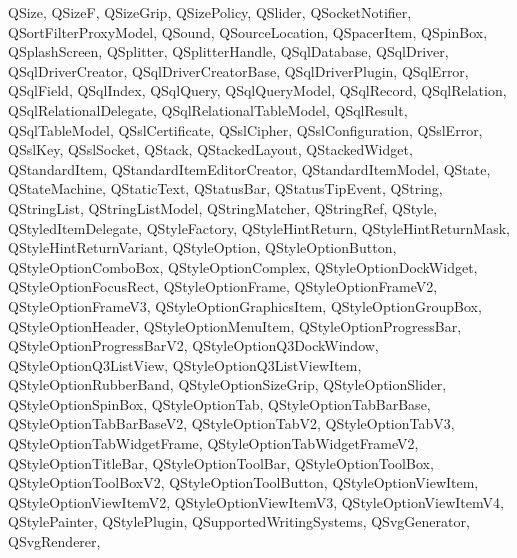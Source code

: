 {{        QSize,
        QSizeF,
        QSizeGrip,
        QSizePolicy,
        QSlider,
        QSocketNotifier,
        QSortFilterProxyModel,
        QSound,
        QSourceLocation,
        QSpacerItem,
        QSpinBox,
        QSplashScreen,
        QSplitter,
        QSplitterHandle,
        QSqlDatabase,
        QSqlDriver,
        QSqlDriverCreator,
        QSqlDriverCreatorBase,
        QSqlDriverPlugin,
        QSqlError,
        QSqlField,
        QSqlIndex,
        QSqlQuery,
        QSqlQueryModel,
        QSqlRecord,
        QSqlRelation,
        QSqlRelationalDelegate,
        QSqlRelationalTableModel,
        QSqlResult,
        QSqlTableModel,
        QSslCertificate,
        QSslCipher,
        QSslConfiguration,
        QSslError,
        QSslKey,
        QSslSocket,
        QStack,
        QStackedLayout,
        QStackedWidget,
        QStandardItem,
        QStandardItemEditorCreator,
        QStandardItemModel,
        QState,
        QStateMachine,
        QStaticText,
        QStatusBar,
        QStatusTipEvent,
        QString,
        QStringList,
        QStringListModel,
        QStringMatcher,
        QStringRef,
        QStyle,
        QStyledItemDelegate,
        QStyleFactory,
        QStyleHintReturn,
        QStyleHintReturnMask,
        QStyleHintReturnVariant,
        QStyleOption,
        QStyleOptionButton,
        QStyleOptionComboBox,
        QStyleOptionComplex,
        QStyleOptionDockWidget,
        QStyleOptionFocusRect,
        QStyleOptionFrame,
        QStyleOptionFrameV2,
        QStyleOptionFrameV3,
        QStyleOptionGraphicsItem,
        QStyleOptionGroupBox,
        QStyleOptionHeader,
        QStyleOptionMenuItem,
        QStyleOptionProgressBar,
        QStyleOptionProgressBarV2,
        QStyleOptionQ3DockWindow,
        QStyleOptionQ3ListView,
        QStyleOptionQ3ListViewItem,
        QStyleOptionRubberBand,
        QStyleOptionSizeGrip,
        QStyleOptionSlider,
        QStyleOptionSpinBox,
        QStyleOptionTab,
        QStyleOptionTabBarBase,
        QStyleOptionTabBarBaseV2,
        QStyleOptionTabV2,
        QStyleOptionTabV3,
        QStyleOptionTabWidgetFrame,
        QStyleOptionTabWidgetFrameV2,
        QStyleOptionTitleBar,
        QStyleOptionToolBar,
        QStyleOptionToolBox,
        QStyleOptionToolBoxV2,
        QStyleOptionToolButton,
        QStyleOptionViewItem,
        QStyleOptionViewItemV2,
        QStyleOptionViewItemV3,
        QStyleOptionViewItemV4,
        QStylePainter,
        QStylePlugin,
        QSupportedWritingSystems,
        QSvgGenerator,
        QSvgRenderer,
}}
